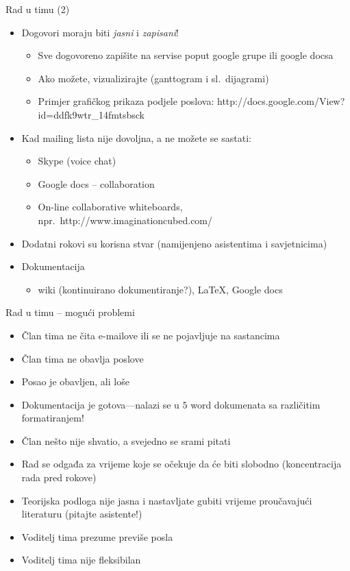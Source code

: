 \documentclass{beamer}
\begin{document}
\begin{frame}[t]{Rad u timu (2)}
\begin{itemize}
  \item Dogovori moraju biti \emph{jasni} i \emph{zapisani}!
  \begin{itemize}
    \item Sve dogovoreno zapišite na servise poput google grupe ili google docsa
    \item Ako možete, vizualizirajte (ganttogram i sl.~dijagrami)
    \item Primjer grafičkog prikaza podjele poslova:
    http://docs.google.com/View?id=ddfk9wtr\_14fmtsbsck
  \end{itemize}
  \item Kad mailing lista nije dovoljna, a ne možete se sastati:
  \begin{itemize}
    \item Skype (voice chat)
    \item Google docs -- collaboration
    \item On-line collaborative whiteboards,
    npr.~http://www.imaginationcubed.com/
  \end{itemize}
  \item Dodatni rokovi su korisna stvar (namijenjeno asistentima i savjetnicima)
  \item Dokumentacija
  \begin{itemize}
    \item wiki (kontinuirano dokumentiranje?), \LaTeX, Google docs
  \end{itemize}
\end{itemize}
\end{frame}

\begin{frame}[t]{Rad u timu -- mogući problemi}
\begin{itemize}
  \item Član tima ne čita e-mailove ili se ne pojavljuje na sastancima
  \item Član tima ne obavlja poslove
  \item Posao je obavljen, ali loše
  \item Dokumentacija je gotova---nalazi se u $5$ word dokumenata sa različitim
  formatiranjem!
  \item Član nešto nije shvatio, a svejedno se srami pitati
  \item Rad se odgađa za vrijeme koje se očekuje da će biti slobodno
  (koncentracija rada pred rokove)
  \item Teorijska podloga nije jasna i nastavljate gubiti vrijeme proučavajući
  literaturu (pitajte asistente!)
  \item Voditelj tima prezume previše posla
  \item Voditelj tima nije fleksibilan
\end{itemize}
\end{frame}
\end{document}
